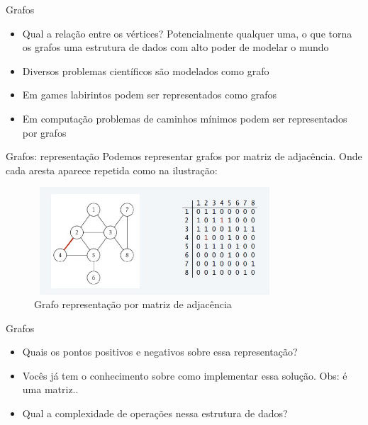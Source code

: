 \begin{frame}
	\begin{block}{Grafos}
		\begin{itemize}
			\item Qual a relação entre os vértices? Potencialmente qualquer uma, o que torna os grafos uma estrutura de dados com alto poder de modelar o mundo
			\item Diversos problemas científicos são modelados como grafo	
			\item Em games labirintos podem ser representados como grafos	
			\item Em computação problemas de caminhos mínimos podem ser representados por grafos
		\end{itemize}
	\end{block}
\end{frame}


\begin{frame}
	\begin{block}{Grafos: representação}
		Podemos representar grafos por matriz de adjacência. Onde cada aresta aparece repetida como na ilustração:
		\begin{figure}[!htb]
			\centering	  				
			\includegraphics[height=4cm, width = 9cm]{./pic/matrizAdjacencia.jpg}
			\caption{Grafo representação por matriz de adjacência \cite{GEEKS_2018}}
		\end{figure}
	\end{block}
\end{frame}

\begin{frame}
	\begin{block}{Grafos}
		\begin{itemize}
			\item Quais os pontos positivos e negativos sobre essa representação?	
			\item Vocês já tem o conhecimento sobre como implementar essa solução. Obs: é uma matriz..	
			\item Qual a complexidade de operações nessa estrutura de dados?
		\end{itemize}
	\end{block}
\end{frame}

